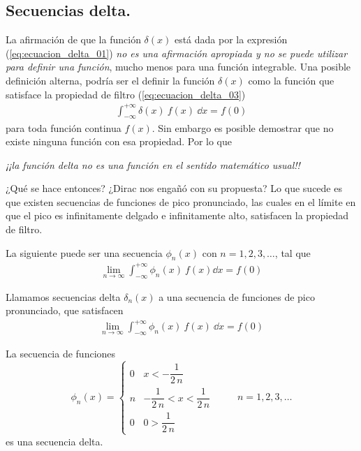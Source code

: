 \subsection{Secuencias delta.}\label{secuencias_delta}
La afirmación de que la función $\delta (x)$ está dada por la expresión (\ref{eq:ecuacion_delta_01}) \textit{no es una afirmación apropiada y no se puede utilizar para definir una función}, mucho menos para una función integrable. Una posible definición alterna, podría ser el definir la función $\delta (x)$ como la función que satisface la propiedad de filtro (\ref{eq:ecuacion_delta_03})
\begin{align*}
\int_{-\infty}^{+ \infty} \delta (x) \: f(x) \: \dd{x} = f(0)
\end{align*}
para toda función continua $f(x)$. Sin embargo es posible demostrar que no existe ninguna función con esa propiedad. Por lo que 
\begin{center}
\textit{¡¡la función delta no es una función en el sentido matemático usual!!}
\end{center}
¿Qué se hace entonces?  ¿Dirac nos engañó con su propuesta? Lo que sucede es que existen secuencias de funciones de pico pronunciado, las cuales en el límite en que el pico es infinitamente delgado e infinitamente alto, satisfacen la propiedad de filtro.
\par
La siguiente puede ser una secuencia $\phi_{n} (x)$ con $n = 1, 2, 3, \ldots$, tal que
\begin{align*}
\lim_{n \to \infty} \int_{-\infty}^{+ \infty} \phi_{n}(x) \: f(x) \dd{x} =  f(0)
\end{align*}
\begin{defi}
Llamamos secuencias delta $\delta_{n} (x)$ a una secuencia de funciones de pico pronunciado, que satisfacen
\begin{align*}
\lim_{n \to \infty} \int_{-\infty}^{+ \infty} \phi_{n} (x) \: f(x) \: \dd{x} =  f(0)
\end{align*}
\end{defi}
\begin{ejemplo}
La secuencia de funciones
\begin{equation}
\phi_{n} (x) = \begin{cases}
0 & x < - \dfrac{1}{2 \, n} \\
n & - \dfrac{1}{2 \, n} < x < \dfrac{1}{2 \, n} \\
0 & 0 >  \dfrac{1}{2 \, n}
\end{cases}
\hspace{1cm} n = 1, 2, 3, \ldots
\label{eq:ecuacion_delta_04}
\end{equation}
es una secuencia delta.
\end{ejemplo}
